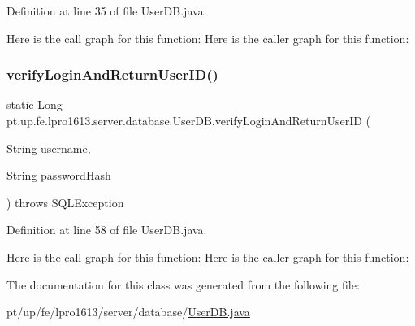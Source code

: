 Definition at line 35 of file User\+D\+B.\+java.

Here is the call graph for this function\+:
Here is the caller graph for this function\+:
\hypertarget{classpt_1_1up_1_1fe_1_1lpro1613_1_1server_1_1database_1_1_user_d_b_ac3083ed924599ce2b694ce622676bca6}{}\label{classpt_1_1up_1_1fe_1_1lpro1613_1_1server_1_1database_1_1_user_d_b_ac3083ed924599ce2b694ce622676bca6} 
\subsubsection{\texorpdfstring{verify\+Login\+And\+Return\+User\+I\+D()}{verifyLoginAndReturnUserID()}}
{\footnotesize\ttfamily static Long pt.\+up.\+fe.\+lpro1613.\+server.\+database.\+User\+D\+B.\+verify\+Login\+And\+Return\+User\+ID (\begin{DoxyParamCaption}\item[{String}]{username,  }\item[{String}]{password\+Hash }\end{DoxyParamCaption}) throws S\+Q\+L\+Exception\hspace{0.3cm}{\ttfamily [static]}}



Definition at line 58 of file User\+D\+B.\+java.

Here is the call graph for this function\+:
Here is the caller graph for this function\+:


The documentation for this class was generated from the following file\+:\begin{DoxyCompactItemize}
\item 
pt/up/fe/lpro1613/server/database/\hyperlink{_user_d_b_8java}{User\+D\+B.\+java}\end{DoxyCompactItemize}
